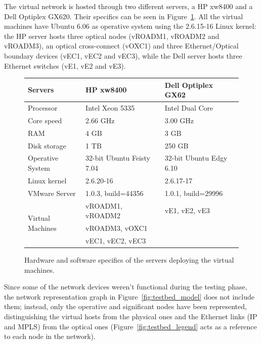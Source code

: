 \documentclass[10pt,a4paper]{report}
\begin{document}
The virtual network is hosted through two different servers, a HP
xw8400 and a Dell Optiplex GX620. Their specifics can be seen in
Figure~\ref{fig:testbed_vm}. All the virtual machines have Ubuntu 6.06
as operative system using the 2.6.15-16 Linux kernel: the HP server
hosts three optical nodes (vROADM1, vROADM2 and vROADM3), an optical
cross-connect (vOXC1) and three Ethernet/Optical boundary devices
(vEC1, vEC2 and vEC3), while the Dell server hosts three Ethernet
switches (vE1, vE2 and vE3).
 
\begin{figure}[!htbp]
  \begin{center}
    \begin{tabular}{|l|l|l|}
      \hline
      Servers & \textbf{HP xw8400} & \textbf{Dell Optiplex GX62} \\
      \hline \hline
      Processor & Intel Xeon 5335 & Intel Dual Core\\ \hline
      Core speed & 2.66 GHz & 3.00 GHz \\ \hline
      RAM & 4 GB & 3 GB \\ \hline
      Disk storage & 1 TB & 250 GB \\ \hline
      Operative System & 32-bit Ubuntu Feisty 7.04 & 32-bit Ubuntu Edgy
      6.10 \\ \hline
      Linux kernel & 2.6.20-16 & 2.6.17-17 \\ \hline
      VMware Server & 1.0.3, build=44356 & 1.0.1, build=29996 \\ \hline
      \multirow{3}{*}{Virtual Machines} & vROADM1, vROADM2 & vE1, vE2,
      vE3 \\
      & vROADM3, vOXC1 & \\
      & vEC1, vEC2, vEC3 & \\ \hline
    \end{tabular}
    \caption[Virtual machines sever specifics]{Hardware and software
      specifics of the servers deploying the virtual machines.}
    \label{fig:testbed_vm}
  \end{center}
\end{figure}
 
Since some of the network devices weren't functional during the
testing phase, the network representation graph in
Figure~\ref{fig:testbed_model} does not include them; instead, only
the operative and significant nodes have been represented,
distinguishing the virtual hosts from the physical ones and the
Ethernet links (IP and MPLS) from the optical ones
(Figure~\ref{fig:testbed_legend} acts as a reference to each node in
the network).
\end{document}
